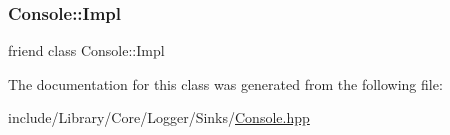 \subsubsection{\texorpdfstring{Console\+::\+Impl}{Console::Impl}}
{\footnotesize\ttfamily friend class Console\+::\+Impl\hspace{0.3cm}{\ttfamily [friend]}}



The documentation for this class was generated from the following file\+:\begin{DoxyCompactItemize}
\item 
include/\+Library/\+Core/\+Logger/\+Sinks/\hyperlink{Console_8hpp}{Console.\+hpp}\end{DoxyCompactItemize}
